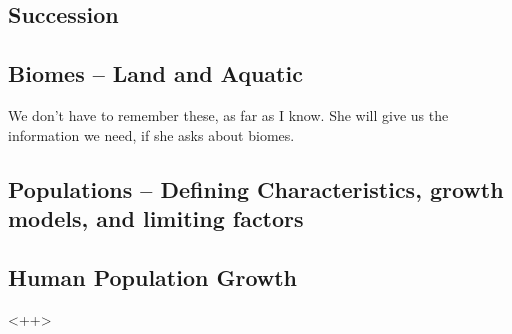 \documentclass{article}
\begin{document}
\subsection{Succession}


\subsection{Biomes -- Land and Aquatic}
We don't have to remember these, as far as I know.
She will give us the information we need, if she asks about biomes.

\subsection{Populations -- Defining Characteristics, growth models, and limiting factors}

\subsection{Human Population Growth}

<++>
\end{document}
